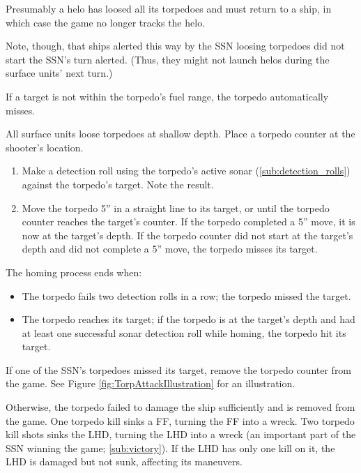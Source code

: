 \documentclass[../TacSubMicroRules.tex]{subfiles}
\begin{document}
\begin{design}
    Presumably a helo has loosed all its torpedoes and must return to a ship, in which case the game no longer tracks the helo.
\end{design}

 
Note, though, that ships alerted this way by the SSN loosing torpedoes did not start the SSN's turn alerted.
(Thus, they might not launch helos during the surface units' next turn.)

 
If a target is not within the torpedo's fuel range, the torpedo automatically misses.

 
All surface units loose torpedoes at shallow depth.
Place a torpedo counter at the shooter's location.

 
\begin{enumerate}
    \item Make a detection roll using the torpedo's active sonar (\ref{sub:detection_rolls}) against the torpedo's target.
        Note the result.
    \item Move the torpedo 5'' in a straight line to its target, or until the torpedo counter reaches the target's counter.
        If the torpedo completed a 5'' move, it is now at the target's depth.
        If the torpedo counter did not start at the target's depth and did not complete a 5'' move, the torpedo misses its target.
\end{enumerate}
The homing process ends when:
\begin{itemize}
    \item The torpedo fails two detection rolls in a row; the torpedo missed the target.
    \item The torpedo reaches its target; if the torpedo is at the target's depth and had at least one successful sonar detection roll while homing, the torpedo hit its target.
\end{itemize}
If one of the SSN's torpedoes missed its target, remove the torpedo counter from the game.
See Figure \ref{fig:TorpAttackIllustration} for an illustration.

 
Otherwise, the torpedo failed to damage the ship sufficiently and is removed from the game.
One torpedo kill sinks a FF, turning the FF into a wreck.
Two torpedo kill shots sinks the LHD, turning the LHD into a wreck (an important part of the SSN winning the game; \ref{sub:victory}).
If the LHD has only one kill on it, the LHD is damaged but not sunk, affecting its maneuvers.
\end{document}

